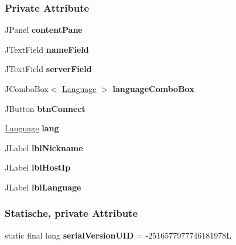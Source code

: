 \subsubsection*{Private Attribute}
\begin{DoxyCompactItemize}
\item 
\hypertarget{a00017_aee369a2eca6b8f16ea106cddf68273e8}{J\-Panel {\bfseries content\-Pane}}\label{a00017_aee369a2eca6b8f16ea106cddf68273e8}

\item 
\hypertarget{a00017_a2b4470f7f3f7456c7e52d1604438a878}{J\-Text\-Field {\bfseries name\-Field}}\label{a00017_a2b4470f7f3f7456c7e52d1604438a878}

\item 
\hypertarget{a00017_a5818e0774952fcd296ac25bba2c3a412}{J\-Text\-Field {\bfseries server\-Field}}\label{a00017_a5818e0774952fcd296ac25bba2c3a412}

\item 
\hypertarget{a00017_a765c7bbc3bba7f753c749e8a28e36187}{J\-Combo\-Box$<$ \hyperlink{a00015}{Language} $>$ {\bfseries language\-Combo\-Box}}\label{a00017_a765c7bbc3bba7f753c749e8a28e36187}

\item 
\hypertarget{a00017_ab18336ae88c7162c8c822907337402f1}{J\-Button {\bfseries btn\-Connect}}\label{a00017_ab18336ae88c7162c8c822907337402f1}

\item 
\hypertarget{a00017_a430764470b3602491655161cdd67ee8c}{\hyperlink{a00015}{Language} {\bfseries lang}}\label{a00017_a430764470b3602491655161cdd67ee8c}

\item 
\hypertarget{a00017_a2e7306cda41914bf0580a04805d80157}{J\-Label {\bfseries lbl\-Nickname}}\label{a00017_a2e7306cda41914bf0580a04805d80157}

\item 
\hypertarget{a00017_a438c152380c37379e8dde366356504fb}{J\-Label {\bfseries lbl\-Host\-Ip}}\label{a00017_a438c152380c37379e8dde366356504fb}

\item 
\hypertarget{a00017_a9863d1276cc1eec382691217ac36d3aa}{J\-Label {\bfseries lbl\-Language}}\label{a00017_a9863d1276cc1eec382691217ac36d3aa}

\end{DoxyCompactItemize}
\subsubsection*{Statische, private Attribute}
\begin{DoxyCompactItemize}
\item 
\hypertarget{a00017_a3238d314ecdee14d2966760945d00c3b}{static final long {\bfseries serial\-Version\-U\-I\-D} = -\/2516577977746181978\-L}\label{a00017_a3238d314ecdee14d2966760945d00c3b}

\end{DoxyCompactItemize}


